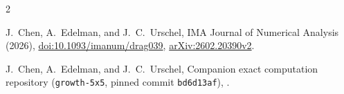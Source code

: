 \documentclass[11pt]{article}
\theoremstyle{remark}
\begin{document}
\begin{thebibliography}{2}

J.~Chen, A.~Edelman, and J.~C.~Urschel,
IMA Journal of Numerical Analysis (2026),
\href{https://doi.org/10.1093/imanum/drag039}{doi:10.1093/imanum/drag039},
\href{https://arxiv.org/abs/2602.20390}{arXiv:2602.20390v2}.

J.~Chen, A.~Edelman, and J.~C.~Urschel,
Companion exact computation repository (\texttt{growth-5x5}, pinned commit
\texttt{bd6d13af}),
\href{https://github.com/jamiecjx/growth-5x5/tree/bd6d13af571d0c454178dac24e753f7cac7a3727}{}.

\end{thebibliography}
\end{document}
